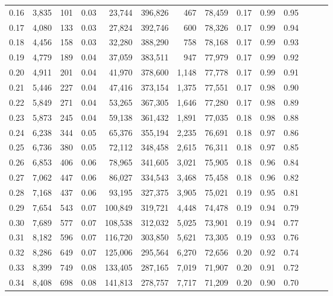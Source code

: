 \begin{tabular}{rrrrrrrrrrrrrr}
0.16 &  3,835 &    101 &  0.03 &   23,744 &  396,826 &     467 &  78,459 &  0.17 &  0.99 &      0.95 \\
0.17 &  4,080 &    133 &  0.03 &   27,824 &  392,746 &     600 &  78,326 &  0.17 &  0.99 &      0.94 \\
0.18 &  4,456 &    158 &  0.03 &   32,280 &  388,290 &     758 &  78,168 &  0.17 &  0.99 &      0.93 \\
0.19 &  4,779 &    189 &  0.04 &   37,059 &  383,511 &     947 &  77,979 &  0.17 &  0.99 &      0.92 \\
0.20 &  4,911 &    201 &  0.04 &   41,970 &  378,600 &   1,148 &  77,778 &  0.17 &  0.99 &      0.91 \\
0.21 &  5,446 &    227 &  0.04 &   47,416 &  373,154 &   1,375 &  77,551 &  0.17 &  0.98 &      0.90 \\
0.22 &  5,849 &    271 &  0.04 &   53,265 &  367,305 &   1,646 &  77,280 &  0.17 &  0.98 &      0.89 \\
0.23 &  5,873 &    245 &  0.04 &   59,138 &  361,432 &   1,891 &  77,035 &  0.18 &  0.98 &      0.88 \\
0.24 &  6,238 &    344 &  0.05 &   65,376 &  355,194 &   2,235 &  76,691 &  0.18 &  0.97 &      0.86 \\
0.25 &  6,736 &    380 &  0.05 &   72,112 &  348,458 &   2,615 &  76,311 &  0.18 &  0.97 &      0.85 \\
0.26 &  6,853 &    406 &  0.06 &   78,965 &  341,605 &   3,021 &  75,905 &  0.18 &  0.96 &      0.84 \\
0.27 &  7,062 &    447 &  0.06 &   86,027 &  334,543 &   3,468 &  75,458 &  0.18 &  0.96 &      0.82 \\
0.28 &  7,168 &    437 &  0.06 &   93,195 &  327,375 &   3,905 &  75,021 &  0.19 &  0.95 &      0.81 \\
0.29 &  7,654 &    543 &  0.07 &  100,849 &  319,721 &   4,448 &  74,478 &  0.19 &  0.94 &      0.79 \\
0.30 &  7,689 &    577 &  0.07 &  108,538 &  312,032 &   5,025 &  73,901 &  0.19 &  0.94 &      0.77 \\
0.31 &  8,182 &    596 &  0.07 &  116,720 &  303,850 &   5,621 &  73,305 &  0.19 &  0.93 &      0.76 \\
0.32 &  8,286 &    649 &  0.07 &  125,006 &  295,564 &   6,270 &  72,656 &  0.20 &  0.92 &      0.74 \\
0.33 &  8,399 &    749 &  0.08 &  133,405 &  287,165 &   7,019 &  71,907 &  0.20 &  0.91 &      0.72 \\
0.34 &  8,408 &    698 &  0.08 &  141,813 &  278,757 &   7,717 &  71,209 &  0.20 &  0.90 &      0.70 \\

\end{tabular}
